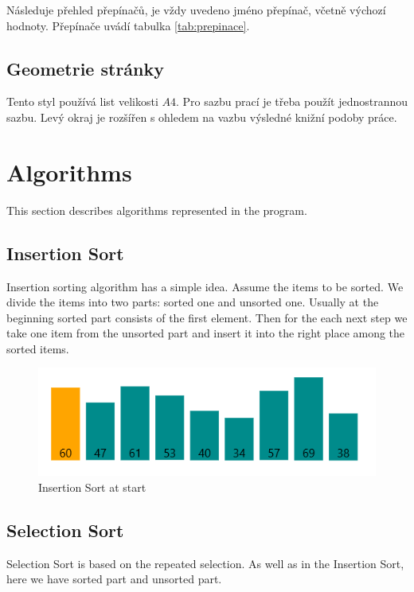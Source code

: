 \documentclass[
  field=inf,
  biblatex,
  language=english,
  glossaries,
  index
]{kidiplom}
\begin{document}
Následuje přehled přepínačů, je vždy uvedeno jméno přepínač, včetně výchozí hodnoty. Přepínače uvádí tabulka \ref{tab:prepinace}.

\subsection{Geometrie stránky}
Tento styl používá list velikosti $A4$. Pro sazbu prací je třeba použít jednostrannou sazbu. Levý okraj je rozšířen s ohledem na vazbu výsledné knižní podoby práce.

\section{Algorithms}

This section describes algorithms represented in the program.

\subsection{Insertion Sort}

Insertion sorting algorithm has a simple idea. Assume the items to be sorted. We divide the items into two parts: sorted one and unsorted one. Usually at the beginning sorted part consists of the first element. Then for the each next step we take one item from the unsorted part and insert it into the right place among the sorted items.
\begin{figure}[H]
\begin{center}
	
	\includegraphics[scale=0.7]{img/Insertion.png}
	\caption{Insertion Sort at start}\label{fig:insert}
\end{center}
\end{figure}


\subsection{Selection Sort}
\label{sec:selection}

Selection Sort is based on the repeated selection. As well as in the Insertion Sort, here we have sorted part and unsorted part.
\end{document}
